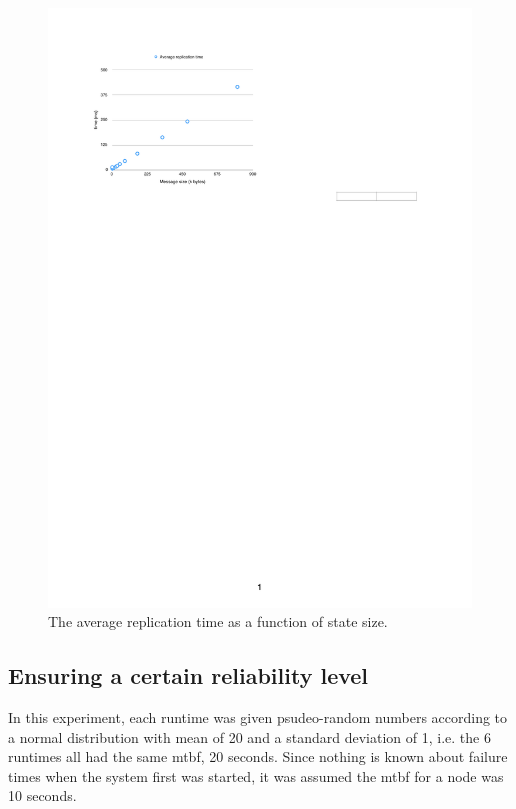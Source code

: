 \documentclass{cslthse-msc}
\begin{document}
\begin{figure}[!hbt]
\centering
\includegraphics[scale=1.0]{images/results/replication_time.pdf} 
\caption{The average replication time as a function of state size.}\label{fig:replication_time}
\end{figure}

\subsection{Ensuring a certain reliability level} \label{sec:eval_rel_level}
In this experiment, each runtime was given psudeo-random numbers according to a normal distribution with mean of 20 and a standard deviation of 1, i.e. the 6 runtimes all had the same mtbf, 20 seconds. Since nothing is known about failure times when the system first was started, it was assumed the mtbf for a node was 10 seconds.
\end{document}
